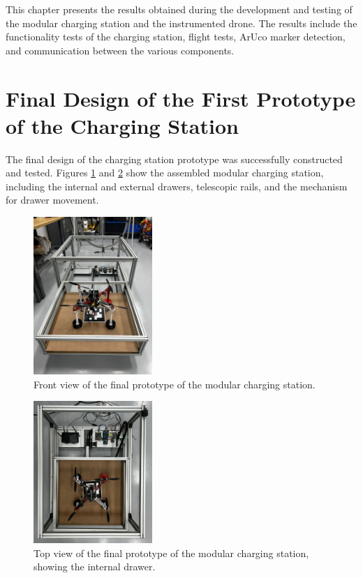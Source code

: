 
This chapter presents the results obtained during the development and testing of the modular charging station and the instrumented drone. The results include the functionality tests of the charging station, flight tests, ArUco marker detection, and communication between the various components.

\section{Final Design of the First Prototype of the Charging Station}

The final design of the charging station prototype was successfully constructed and tested. Figures \ref{fig:charging_station_assembled_1} and \ref{fig:charging_station_assembled_2} show the assembled modular charging station, including the internal and external drawers, telescopic rails, and the mechanism for drawer movement.

\begin{figure}[H]
    \centering
    \includegraphics[width=0.4\textwidth]{pictures/ESTACION_FINAL.jpg}
    \caption{Front view of the final prototype of the modular charging station.}
    \label{fig:charging_station_assembled_1}
\end{figure}

\begin{figure}[H]
    \centering
    \includegraphics[width=0.4\textwidth]{pictures/charg_station_top.jpeg}
    \caption{Top view of the final prototype of the modular charging station, showing the internal drawer.}
    \label{fig:charging_station_assembled_2}
\end{figure}

